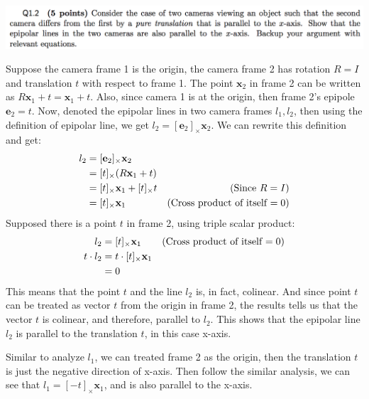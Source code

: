\documentclass[12pt,letterpaper,boxed]{hmcpset}
\begin{document}
\begin{problem}[]
\includegraphics[width=\textwidth]{1_2.png}
\end{problem}
\begin{solution}
Suppose the camera frame 1 is the origin, the camera frame 2 has rotation $R = I$ and translation $t$ with respect to frame 1. The point $\mathbf{x}_2$ in frame 2 can be written as $R\mathbf{x}_1+t = \mathbf{x}_1+t$. Also, since camera 1 is at the origin, then frame 2's epipole $\mathbf{e}_2 = t$. Now, denoted the epipolar lines in two camera frames $l_1, l_2$, then using the definition of epipolar line,
we get $l_2 = [\mathbf{e}_2]_\times \mathbf{x}_2$. We can rewrite this definition and get:
\begin{align*}
  l_2 &= [\mathbf{e}_2]_\times \mathbf{x}_2\\
      &= [t]_\times (R\mathbf{x}_1+t)\\
      &= [t]_\times\mathbf{x}_1 + [t]_\times t &\text{(Since $R = I$)}\\
      &= [t]_\times\mathbf{x}_1 &\text{(Cross product of itself $ = 0$)}\\
\end{align*}
Supposed there is a point $t$ in frame 2, using triple scalar product:
\begin{align*}
  l_2 &= [t]_\times\mathbf{x}_1 &\text{(Cross product of itself $ = 0$)}\\
  t \cdot l_2 &= t \cdot [t]_\times\mathbf{x}_1 \\
              &= 0
\end{align*}
This means that the point $t$ and the line $l_2$ is, in fact, colinear. And since point $t$ can
be treated as vector $t$ from the origin in frame 2, the results tells us that the vector $t$ is
colinear, and therefore, parallel to $l_2$. This shows that the epipolar line $l_2$ is parallel to the translation $t$, in this case x-axis. 

Similar to analyze $l_1$, we can treated frame 2 as the origin, then the translation $t$ is just the negative
direction of x-axis. Then follow the similar analysis, we can see that $l_1 = [-t]_\times\mathbf{x}_1$, and is also
parallel to the x-axis.
\end{solution}
\end{document}
